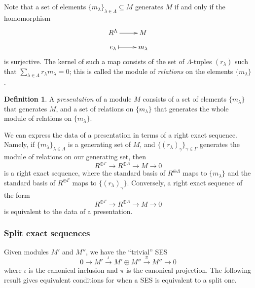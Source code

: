 \documentclass{amsart}[12pt]
\newcommand{\DEF}[1]{\emph{#1}\index{#1}}
\numberwithin{equation}{section}
\theoremstyle{plain} %
\theoremstyle{definition}
\newtheorem{defn}[equation]{Definition}
\theoremstyle{remark}
\newcommand{\sssec}[1]{\subsubsection{#1}}
\newcommand{\xra}[1]{\xrightarrow{#1}}
\begin{document}
Note that a set of elements $\{m_\lambda\}_{\lambda\in \Lambda} \subseteq M$ generates $M$ if and only if the homomorphism 
\[\xymatrix@R=.7em{ R^{\Lambda} \ar[r] & M \\
e_{\lambda} \ar@{|->}[r] & m_{\lambda} }\]
is surjective. The kernel of such a map consists of the set of $\Lambda$-tuples $(r_\lambda)$ such that $\sum_{\lambda\in\Lambda} r_\lambda m_\lambda =0$; this is called the module of \DEF{relations} on the elements $\{m_\lambda\}$.

\begin{defn} A \DEF{presentation} of a module $M$ consists of a set of elements $\{m_\lambda\}$ that generates $M$, and a set of relations on $\{m_\lambda\}$ that generates the  whole module of relations on $\{m_\lambda\}$.
\end{defn}

We can express the data of a presentation in terms of a right exact sequence. Namely, if $\{m_\lambda\}_{\lambda\in \Lambda}$ is a generating set of $M$, and $\{ (r_\lambda)_\gamma\}_{\gamma\in \Gamma}$ generates the module of relations on our generating set, then
\[ R^{\oplus\Gamma} \to R^{\oplus\Lambda} \to M \to 0\] is a right exact sequence, where the standard basis of $R^{\oplus\Lambda}$ maps to $\{m_\lambda\}$ and the standard basis of $R^{\oplus\Gamma}$ maps to $\{ (r_\lambda)_\gamma\}$. Conversely, a right exact sequence of the form
\[ R^{\oplus\Gamma} \to R^{\oplus\Lambda} \to M \to 0\] 
 is equivalent to the data of a presentation.

\sssec{Split exact sequences}

    
    
    Given modules $M'$ and $M''$, we have the ``trivial'' SES
$$
0 \to M' \xra{\iota} M' \oplus M'' \xra{\pi} M'' \to 0
$$
where $\iota$ is the canonical inclusion and $\pi$ is the canonical projection. The following result gives equivalent conditions for 
when a SES is equivalent to a split one.
\end{document}
